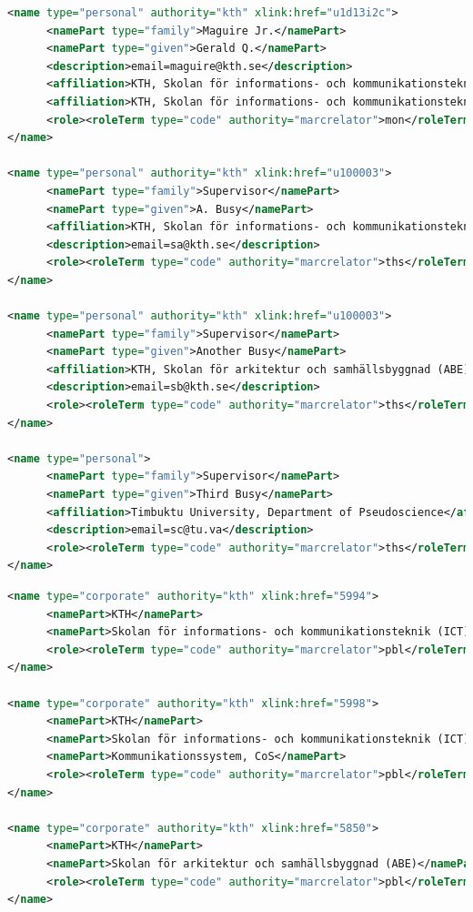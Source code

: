 \begin{lstlisting}[language={XML}, caption={MODS data for the supervisors and examiners}, label=lst:reducedModesExaminerAndSupervisors]
<name type="personal" authority="kth" xlink:href="u1d13i2c">
      <namePart type="family">Maguire Jr.</namePart>
      <namePart type="given">Gerald Q.</namePart>
      <description>email=maguire@kth.se</description>
      <affiliation>KTH, Skolan för informations- och kommunikationsteknik (ICT), Kommunikationssystem, CoS</affiliation>
      <affiliation>KTH, Skolan för informations- och kommunikationsteknik (ICT)</affiliation>
      <role><roleTerm type="code" authority="marcrelator">mon</roleTerm></role>
</name>

<name type="personal" authority="kth" xlink:href="u100003">
      <namePart type="family">Supervisor</namePart>
      <namePart type="given">A. Busy</namePart>
      <affiliation>KTH, Skolan för informations- och kommunikationsteknik (ICT)</affiliation>
      <description>email=sa@kth.se</description>
      <role><roleTerm type="code" authority="marcrelator">ths</roleTerm></role>
</name>

<name type="personal" authority="kth" xlink:href="u100003">
      <namePart type="family">Supervisor</namePart>
      <namePart type="given">Another Busy</namePart>
      <affiliation>KTH, Skolan för arkitektur och samhällsbyggnad (ABE)</affiliation>
      <description>email=sb@kth.se</description>
      <role><roleTerm type="code" authority="marcrelator">ths</roleTerm></role>
</name>

<name type="personal">
      <namePart type="family">Supervisor</namePart>
      <namePart type="given">Third Busy</namePart>
      <affiliation>Timbuktu University, Department of Pseudoscience</affiliation>
      <description>email=sc@tu.va</description>
      <role><roleTerm type="code" authority="marcrelator">ths</roleTerm></role>
</name>
\end{lstlisting}
\clearpage

\begin{lstlisting}[language={XML}, caption={Corporate name data in MODS data for the affiliations}, label=lst:reducedModesCorpNames]
<name type="corporate" authority="kth" xlink:href="5994">
      <namePart>KTH</namePart>
      <namePart>Skolan för informations- och kommunikationsteknik (ICT)</namePart>
      <role><roleTerm type="code" authority="marcrelator">pbl</roleTerm></role>
</name>

<name type="corporate" authority="kth" xlink:href="5998">
      <namePart>KTH</namePart>
      <namePart>Skolan för informations- och kommunikationsteknik (ICT)</namePart>
      <namePart>Kommunikationssystem, CoS</namePart>
      <role><roleTerm type="code" authority="marcrelator">pbl</roleTerm></role>
</name>

<name type="corporate" authority="kth" xlink:href="5850">
      <namePart>KTH</namePart>
      <namePart>Skolan för arkitektur och samhällsbyggnad (ABE)</namePart>
      <role><roleTerm type="code" authority="marcrelator">pbl</roleTerm></role>
</name>
\end{lstlisting}

